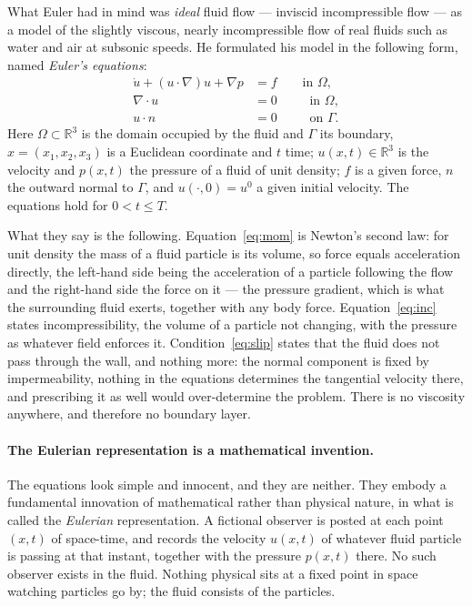 \documentclass[11pt]{article}
\newcommand{\grad}{\nabla}
\begin{document}
\noindent What Euler had in mind was \emph{ideal} fluid flow --- inviscid incompressible flow --- as
a model of the slightly viscous, nearly incompressible flow of real fluids such as water and air at
subsonic speeds. He formulated his model in the following form, named \emph{Euler's equations}:
\begin{align}
\dot u + (u\cdot\grad)u + \grad p &= f \qquad\text{in }\Omega, \label{eq:mom}\\[2pt]
\grad\cdot u &= 0 \qquad\;\;\text{in }\Omega, \label{eq:inc}\\[2pt]
u\cdot n &= 0 \qquad\;\;\text{on }\Gamma . \label{eq:slip}
\end{align}
Here $\Omega\subset\mathbb{R}^3$ is the domain occupied by the fluid and $\Gamma$ its boundary,
$x=(x_1,x_2,x_3)$ is a Euclidean coordinate and $t$ time; $u(x,t)\in\mathbb{R}^3$ is the velocity and
$p(x,t)$ the pressure of a fluid of unit density; $f$ is a given force, $n$ the outward normal to
$\Gamma$, and $u(\cdot,0)=u^0$ a given initial velocity. The equations hold for $0<t\le T$.

What they say is the following. Equation~\eqref{eq:mom} is Newton's second law: for unit density the
mass of a fluid particle is its volume, so force equals acceleration directly, the left-hand side
being the acceleration of a particle following the flow and the right-hand side the force on it ---
the pressure gradient, which is what the surrounding fluid exerts, together with any body force.
Equation~\eqref{eq:inc} states incompressibility, the volume of a particle not changing, with the
pressure as whatever field enforces it. Condition~\eqref{eq:slip} states that the fluid does not pass
through the wall, and nothing more: the normal component is fixed by impermeability, nothing in the
equations determines the tangential velocity there, and prescribing it as well would over-determine
the problem. There is no viscosity anywhere, and therefore no boundary layer.

\paragraph{The Eulerian representation is a mathematical invention.} The equations look simple and
innocent, and they are neither. They embody a fundamental innovation of mathematical rather than
physical nature, in what is called the \emph{Eulerian} representation. A fictional observer is posted
at each point $(x,t)$ of space-time, and records the velocity $u(x,t)$ of whatever fluid particle is
passing at that instant, together with the pressure $p(x,t)$ there. No such observer exists in the
fluid. Nothing physical sits at a fixed point in space watching particles go by; the fluid consists
of the particles.
\end{document}

